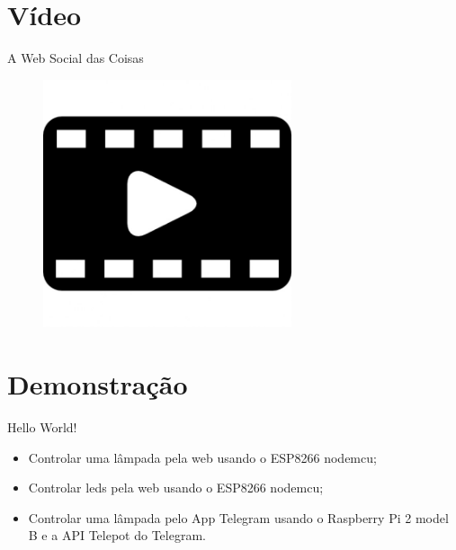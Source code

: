 \section{Vídeo}
\ncframesummary

\begin{frame}{A Web Social das Coisas \cite{Ericsson}}	
	\begin{figure}[!b]
		\centering
		\href{run:mov/iot-ericsson.mp4}{\includegraphics[width=0.65\textwidth]{img/video.jpg}}
	\end{figure}
\end{frame}

\section{Demonstração}
\ncframesummary

\begin{frame}{Hello World!}	
	\begin{itemize}
		\item Controlar uma lâmpada pela web usando o ESP8266 nodemcu;
		\item Controlar leds pela web usando o ESP8266 nodemcu;
		\item Controlar uma lâmpada pelo App Telegram usando o Raspberry Pi 2 model B e a API Telepot do Telegram.
	\end{itemize}
\end{frame}